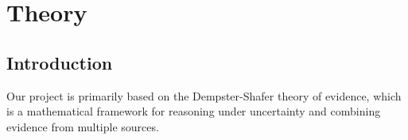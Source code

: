 \chapter{Theory}

\section{Introduction}

Our project is primarily based on the Dempster-Shafer theory of evidence, which is a mathematical framework for reasoning under uncertainty and combining evidence from multiple sources.







